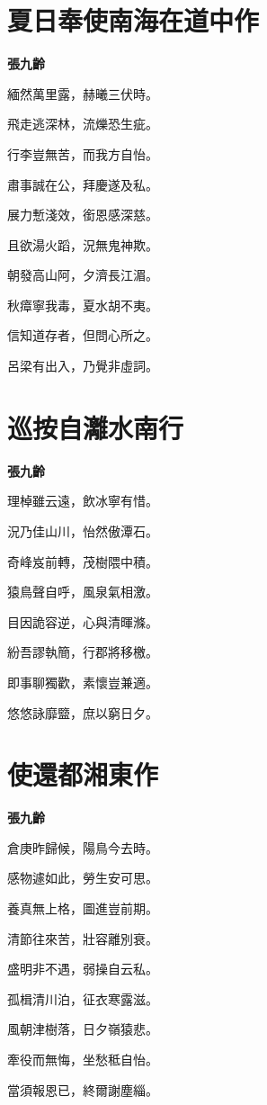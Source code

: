 \documentclass[12pt,a4paper]{ctexbook}
\begin{document}
\section{夏日奉使南海在道中作}
\textbf{張九齡}\par\vspace{0.5em}
緬然萬里露，赫曦三伏時。\par
飛走逃深林，流爍恐生疵。\par
行李豈無苦，而我方自怡。\par
肅事誠在公，拜慶遂及私。\par
展力慙淺效，銜恩感深慈。\par
且欲湯火蹈，況無鬼神欺。\par
朝發高山阿，夕濟長江湄。\par
秋瘴寧我毒，夏水胡不夷。\par
信知道存者，但問心所之。\par
呂梁有出入，乃覺非虛詞。\par

\section{巡按自灕水南行}
\textbf{張九齡}\par\vspace{0.5em}
理棹雖云遠，飲冰寧有惜。\par
況乃佳山川，怡然傲潭石。\par
奇峰岌前轉，茂樹隈中積。\par
猿鳥聲自呼，風泉氣相激。\par
目因詭容逆，心與清暉滌。\par
紛吾謬執簡，行郡將移檄。\par
即事聊獨歡，素懷豈兼適。\par
悠悠詠靡盬，庶以窮日夕。\par

\section{使還都湘東作}
\textbf{張九齡}\par\vspace{0.5em}
倉庚昨歸候，陽鳥今去時。\par
感物遽如此，勞生安可思。\par
養真無上格，圖進豈前期。\par
清節往來苦，壯容離別衰。\par
盛明非不遇，弱操自云私。\par
孤楫清川泊，征衣寒露滋。\par
風朝津樹落，日夕嶺猿悲。\par
牽役而無悔，坐愁秪自怡。\par
當須報恩已，終爾謝塵緇。\par
\end{document}
